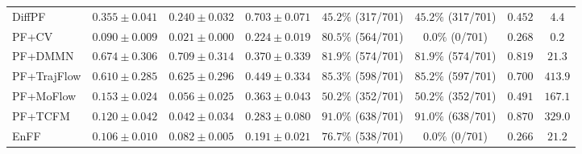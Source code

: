 \begin{table}[t]
{\begin{tabular}{lccccccc}
DiffPF
& $0.355 \pm 0.041$ & $0.240 \pm 0.032$ & $0.703 \pm 0.071$ & $45.2\%$ (317/701) & $45.2\%$ (317/701) & $0.452$ & $4.4$ \\
PF+CV
& $0.090 \pm 0.009$ & $0.021 \pm 0.000$ & $0.224 \pm 0.019$ & $80.5\%$ (564/701) & $0.0\%$ (0/701) & $0.268$ & $0.2$ \\
PF+DMMN
& $0.674 \pm 0.306$ & $0.709 \pm 0.314$ & $0.370 \pm 0.339$ & $81.9\%$ (574/701) & $81.9\%$ (574/701) & $0.819$ & $21.3$ \\
PF+TrajFlow
& $0.610 \pm 0.285$ & $0.625 \pm 0.296$ & $0.449 \pm 0.334$ & $85.3\%$ (598/701) & $85.2\%$ (597/701) & $0.700$ & $413.9$ \\
PF+MoFlow
& $0.153 \pm 0.024$ & $0.056 \pm 0.025$ & $0.363 \pm 0.043$ & $50.2\%$ (352/701) & $50.2\%$ (352/701) & $0.491$ & $167.1$ \\
PF+TCFM
& $0.120 \pm 0.042$ & $0.042 \pm 0.034$ & $0.283 \pm 0.080$ & $\mathbf{91.0\%}$ (638/701) & $\mathbf{91.0\%}$ (638/701) & $\mathbf{0.870}$ & $329.0$ \\
EnFF
& $0.106 \pm 0.010$ & $0.082 \pm 0.005$ & $0.191 \pm 0.021$ & $76.7\%$ (538/701) & $0.0\%$ (0/701) & $0.266$ & $21.2$ \\
\hline
\end{tabular}%
}
\end{table}
